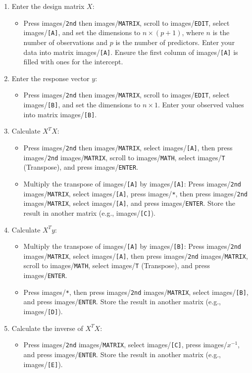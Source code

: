 \documentclass{article}
\newcommand{\code}[1]{images/\colorbox{light-gray}{\texttt{#1}}}
\begin{document}
\begin{enumerate}
    \item Enter the design matrix $X$:
    \begin{itemize}
        \item Press \code{2nd} then \code{MATRIX}, scroll to \code{EDIT}, select \code{[A]}, and set the dimensions to $n \times (p+1)$, where $n$ is the number of observations and $p$ is the number of predictors. Enter your data into matrix \code{[A]}. Ensure the first column of \code{[A]} is filled with ones for the intercept.
    \end{itemize}
    \item Enter the response vector $y$:
    \begin{itemize}
        \item Press \code{2nd} then \code{MATRIX}, scroll to \code{EDIT}, select \code{[B]}, and set the dimensions to $n \times 1$. Enter your observed values into matrix \code{[B]}.
    \end{itemize}
    \item Calculate $X^T X$:
    \begin{itemize}
        \item Press \code{2nd} then \code{MATRIX}, select \code{[A]}, then press \code{2nd} \code{MATRIX}, scroll to \code{MATH}, select \code{T} (Transpose), and press \code{ENTER}.
        \item Multiply the transpose of \code{[A]} by \code{[A]}: Press \code{2nd} \code{MATRIX}, select \code{[A]}, press \code{*}, then press \code{2nd} \code{MATRIX}, select \code{[A]}, and press \code{ENTER}. Store the result in another matrix (e.g., \code{[C]}).
    \end{itemize}
    \item Calculate $X^T y$:
    \begin{itemize}
        \item Multiply the transpose of \code{[A]} by \code{[B]}: Press \code{2nd} \code{MATRIX}, select \code{[A]}, then press \code{2nd} \code{MATRIX}, scroll to \code{MATH}, select \code{T} (Transpose), and press \code{ENTER}.
        \item Press \code{*}, then press \code{2nd} \code{MATRIX}, select \code{[B]}, and press \code{ENTER}. Store the result in another matrix (e.g., \code{[D]}).
    \end{itemize}
    \item Calculate the inverse of $X^T X$:
    \begin{itemize}
        \item Press \code{2nd} \code{MATRIX}, select \code{[C]}, press \code{$x^{-1}$}, and press \code{ENTER}. Store the result in another matrix (e.g., \code{[E]}).

\end{itemize}
\end{enumerate}
\end{document}
